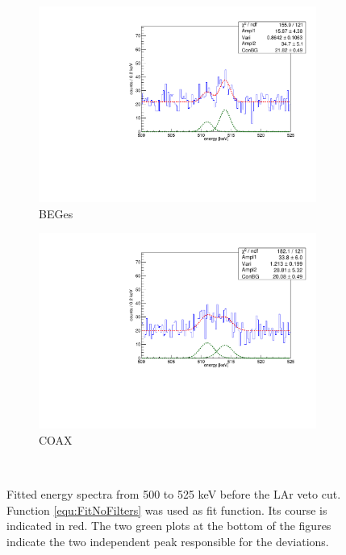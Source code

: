 \documentclass[encoding=utf8,british]{tumphthesis}
\begin{document}
\begin{figure}[t!]
	\centering
	\begin{subfigure}{.5\textwidth}
		\centering
		\includegraphics[width=\textwidth]{./Bilder/500525FitNoFilterBEGes.pdf}
		\caption{BEGes}
		\label{fig:FitNoFilterBEGes}
	\end{subfigure}\hfill%
	\begin{subfigure}{.5\textwidth}
		\centering
		\includegraphics[width=\textwidth]{./Bilder/500525FitNoFilterCOAX.pdf}
		\caption{COAX}
		\label{fig:FitNoFilterCOAX}
	\end{subfigure}
    \\
	\caption{
		Fitted energy spectra from 500 to 525 keV before the LAr veto cut. 
		Function \ref{equ:FitNoFilters} was used as fit function. 
		Its course is indicated in red. 
		The two green plots at the bottom of the figures indicate the two independent peak responsible for the deviations. 
		}
\end{figure}
\\
\end{document}
